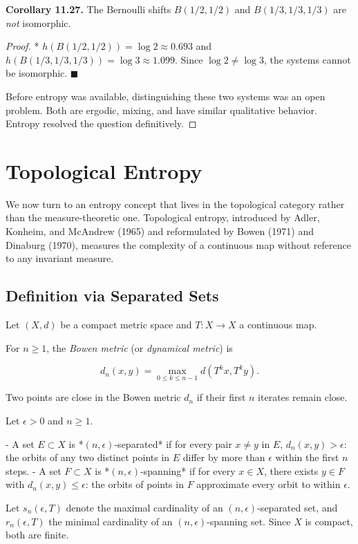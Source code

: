 \textbf{Corollary 11.27.} The Bernoulli shifts $B(1/2, 1/2)$ and $B(1/3, 1/3, 1/3)$ are \textit{not} isomorphic.

\begin{proof}
* $h(B(1/2, 1/2)) = \log 2 \approx 0.693$ and $h(B(1/3, 1/3, 1/3)) = \log 3 \approx 1.099$. Since $\log 2 \neq \log 3$, the systems cannot be isomorphic. $\blacksquare$

Before entropy was available, distinguishing these two systems was an open problem. Both are ergodic, mixing, and have similar qualitative behavior. Entropy resolved the question definitively.


\bigskip


\end{proof}

\section{Topological Entropy}\label{sec:11.7}

We now turn to an entropy concept that lives in the topological category rather than the measure-theoretic one. Topological entropy, introduced by Adler, Konheim, and McAndrew (1965) and reformulated by Bowen (1971) and Dinaburg (1970), measures the complexity of a continuous map without reference to any invariant measure.

\subsection{Definition via Separated Sets}\label{sec:11.7.1}

Let $(X, d)$ be a compact metric space and $T \colon X \to X$ a continuous map.

\begin{definition}\label{def:11.28}
For $n \geq 1$, the \textit{Bowen metric} (or \textit{dynamical metric}) is

\[
d_n(x, y) = \max_{0 \leq k \leq n-1} d(T^k x, T^k y).
\]

Two points are close in the Bowen metric $d_n$ if their first $n$ iterates remain close.
\end{definition}


\begin{definition}\label{def:11.29}
Let $\epsilon > 0$ and $n \geq 1$.

- A set $E \subset X$ is *$(n, \epsilon)$-separated* if for every pair $x \neq y$ in $E$, $d_n(x, y) > \epsilon$: the orbits of any two distinct points in $E$ differ by more than $\epsilon$ within the first $n$ steps.
- A set $F \subset X$ is *$(n, \epsilon)$-spanning* if for every $x \in X$, there exists $y \in F$ with $d_n(x, y) \leq \epsilon$: the orbits of points in $F$ approximate every orbit to within $\epsilon$.

Let $s_n(\epsilon, T)$ denote the maximal cardinality of an $(n, \epsilon)$-separated set, and $r_n(\epsilon, T)$ the minimal cardinality of an $(n, \epsilon)$-spanning set. Since $X$ is compact, both are finite.
\end{definition}



